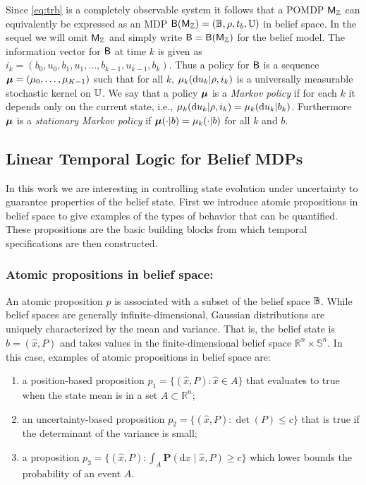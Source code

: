 \documentclass{ifacconf}
\begin{document}
Since \eqref{eq:trb} is a completely observable system it follows that a POMDP $\mathsf{M}_{{\mathbb{Z}}}$ can equivalently be expressed as an MDP $\mathsf{B}(\mathsf{M}_{{\mathbb{Z}}}) = (\mathbb{B}, \rho, t_b, {\mathbb{U}})$ in belief space. In the sequel we will omit $\mathsf{M}_{{\mathbb{Z}}}$ and simply write $\mathsf{B} = \mathsf{B}(\mathsf{M}_{{\mathbb{Z}}})$ for the belief model. The information vector for $\mathsf{B}$ at time $k$ is given as $i_k=(b_0, u_0, b_1, u_1, \ldots, b_{k-1}, u_{k-1}, b_k)$. Thus a policy for $\mathsf{B}$ is a sequence ${\boldsymbol{\mu}}=({\mu}_0,\ldots,{\mu}_{K-1})$ such that for all $k$, ${\mu}_k(\mathrm{d}u_k|\rho, i_k)$ is a universally measurable stochastic kernel on ${\mathbb{U}}$.	We say that a policy ${\boldsymbol{\mu}}$ is a \emph{Markov policy} if for each $k$ it depends only on the current state, i.e., ${\mu}_k(\mathrm{d} u_k|\rho, i_k) = {\mu}_k(\mathrm{d} u_k| b_k)$. Furthermore ${\boldsymbol{\mu}}$ is a \emph{stationary Markov policy} if ${\boldsymbol{\mu}}(\cdot | b)= {\mu}_k( \cdot |b)$ for all $k$ and $b$.


\subsection{Linear Temporal Logic for Belief MDPs}

In this work we are interesting in controlling state evolution under uncertainty to guarantee properties of the belief state. First we introduce atomic propositions in belief space to give examples of the types of behavior that can be quantified. These propositions are the basic building blocks from which temporal specifications are then constructed.

\subsubsection{Atomic propositions in belief space:}

An atomic proposition $p$ is associated with a subset of the belief space $\mathbb{B}$. While belief spaces are generally infinite-dimensional, Gaussian distributions are uniquely characterized by the mean and variance. That is, the belief state is $b = (\hat x, P)$ and takes values in the finite-dimensional belief space $\mathbb{R}^n \times \mathbb{S}^n$. In this case, examples of atomic propositions in belief space are:
\begin{enumerate}
  \item a position-based proposition $p_1 = \{ (\hat x, P) : \hat x \in A \}$ that evaluates to true when the state mean is in a set $A \subset \mathbb{R}^n$;
  \item an uncertainty-based proposition $p_2 = \{ (\hat x, P) : \det(P) \leq c \}$ that is true if the determinant of the variance is small;
  \item a proposition $p_3 = \{ (\hat x, P) : \int_{A} \mathbf{P}( \mathrm{d} x \mid \hat x, P) \geq c \}$ which lower bounds the probability of an event $A$.
\end{enumerate}
\end{document}
